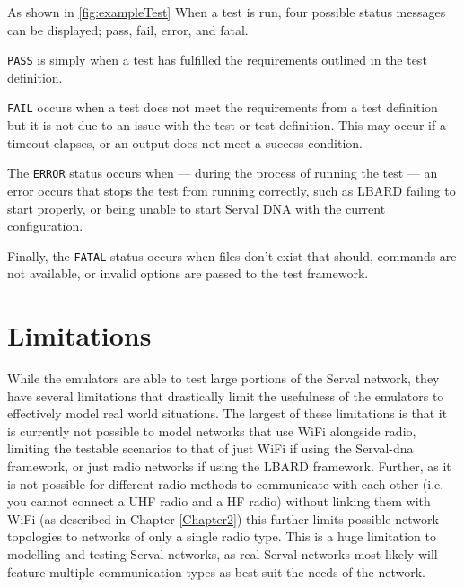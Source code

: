 As shown in \figurename{ \ref{fig:exampleTest}} When a test is run, four possible status messages can be displayed; pass, fail, error, and fatal.
\begin{list}{}{}
    \item \texttt{PASS} is simply when a test has fulfilled the requirements outlined in the test definition.

    \item \texttt{FAIL} occurs when a test does not meet the requirements from a test definition but it is not due to an issue with the test or test definition. This may occur if a timeout elapses, or an output does not meet a success condition.
    
    \item The \texttt{ERROR} status occurs when — during the process of running the test — an error occurs that stops the test from running correctly, such as LBARD failing to start properly, or being unable to start Serval DNA with the current configuration.
    
    \item Finally, the \texttt{FATAL} status occurs when files don't exist that should, commands are not available, or invalid options are passed to the test framework.    
\end{list}




\section{Limitations}
While the emulators are able to test large portions of the Serval network, they have several limitations that drastically limit the usefulness of the emulators to effectively model real world situations.
The largest of these limitations is that it is currently not possible to model networks that use WiFi alongside radio, limiting the testable scenarios to that of just WiFi if using the Serval-dna framework, or just radio networks if using the LBARD framework.
Further, as it is not possible for different radio methods to communicate with each other (i.e. you cannot connect a UHF radio and a HF radio) without linking them with WiFi (as described in Chapter \ref{Chapter2}) this further limits possible network topologies to networks of only a single radio type.
This is a huge limitation to modelling and testing Serval networks, as real Serval networks most likely will feature multiple communication types as best suit the needs of the network.

